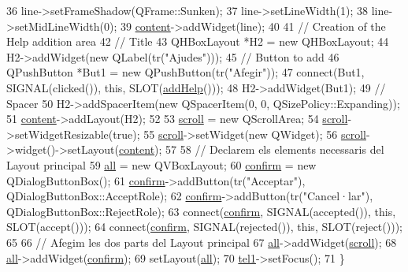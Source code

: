 \begin{DoxyCode}
36     line->setFrameShadow(QFrame::Sunken);
37     line->setLineWidth(1);
38     line->setMidLineWidth(0);
39     \hyperlink{class_ins_dialog_a9b0df6254c3f39e812bbeb0ef85c1d0c}{content}->addWidget(line);
40     
41     \textcolor{comment}{// Creation of the Help addition area}
42     \textcolor{comment}{// Title}
43     QHBoxLayout *H2 = \textcolor{keyword}{new} QHBoxLayout;
44     H2->addWidget(\textcolor{keyword}{new} QLabel(tr(\textcolor{stringliteral}{"Ajudes"})));
45     \textcolor{comment}{// Button to add}
46     QPushButton *But1 = \textcolor{keyword}{new} QPushButton(tr(\textcolor{stringliteral}{"Afegir"}));
47     connect(But1, SIGNAL(clicked()), \textcolor{keyword}{this}, SLOT(\hyperlink{class_ins_dialog_a44a1f7a74f99cfff6cb76babfb7ffbe0}{addHelp}()));
48     H2->addWidget(But1);
49     \textcolor{comment}{// Spacer}
50     H2->addSpacerItem(\textcolor{keyword}{new} QSpacerItem(0, 0, QSizePolicy::Expanding));
51     \hyperlink{class_ins_dialog_a9b0df6254c3f39e812bbeb0ef85c1d0c}{content}->addLayout(H2);
52             
53     \hyperlink{class_ins_dialog_a822e0887cf9597f75ed5c4a772a8c9db}{scroll} = \textcolor{keyword}{new} QScrollArea;
54     \hyperlink{class_ins_dialog_a822e0887cf9597f75ed5c4a772a8c9db}{scroll}->setWidgetResizable(\textcolor{keyword}{true});
55     \hyperlink{class_ins_dialog_a822e0887cf9597f75ed5c4a772a8c9db}{scroll}->setWidget(\textcolor{keyword}{new} QWidget);
56     \hyperlink{class_ins_dialog_a822e0887cf9597f75ed5c4a772a8c9db}{scroll}->widget()->setLayout(\hyperlink{class_ins_dialog_a9b0df6254c3f39e812bbeb0ef85c1d0c}{content});
57     
58     \textcolor{comment}{// Declarem els elements necessaris del Layout principal}
59     \hyperlink{class_ins_dialog_ab8de5f3cd72b44a3b3524fc52bac148c}{all} = \textcolor{keyword}{new} QVBoxLayout;    
60     \hyperlink{class_ins_dialog_aa77dfa096f7cd3bc82823f6944ecbd8b}{confirm} = \textcolor{keyword}{new} QDialogButtonBox();
61     \hyperlink{class_ins_dialog_aa77dfa096f7cd3bc82823f6944ecbd8b}{confirm}->addButton(tr(\textcolor{stringliteral}{"Acceptar"}), QDialogButtonBox::AcceptRole);
62     \hyperlink{class_ins_dialog_aa77dfa096f7cd3bc82823f6944ecbd8b}{confirm}->addButton(tr(\textcolor{stringliteral}{"Cancel·lar"}), QDialogButtonBox::RejectRole);
63     connect(\hyperlink{class_ins_dialog_aa77dfa096f7cd3bc82823f6944ecbd8b}{confirm}, SIGNAL(accepted()), \textcolor{keyword}{this}, SLOT(accept()));
64     connect(\hyperlink{class_ins_dialog_aa77dfa096f7cd3bc82823f6944ecbd8b}{confirm}, SIGNAL(rejected()), \textcolor{keyword}{this}, SLOT(reject()));
65     
66     \textcolor{comment}{// Afegim les dos parts del Layout principal}
67     \hyperlink{class_ins_dialog_ab8de5f3cd72b44a3b3524fc52bac148c}{all}->addWidget(\hyperlink{class_ins_dialog_a822e0887cf9597f75ed5c4a772a8c9db}{scroll});
68     \hyperlink{class_ins_dialog_ab8de5f3cd72b44a3b3524fc52bac148c}{all}->addWidget(\hyperlink{class_ins_dialog_aa77dfa096f7cd3bc82823f6944ecbd8b}{confirm});
69     setLayout(\hyperlink{class_ins_dialog_ab8de5f3cd72b44a3b3524fc52bac148c}{all});
70     \hyperlink{class_ins_dialog_a7dc562149fa67417983c78fe2621d7f9}{tel1}->setFocus();
71 \}
\end{DoxyCode}
